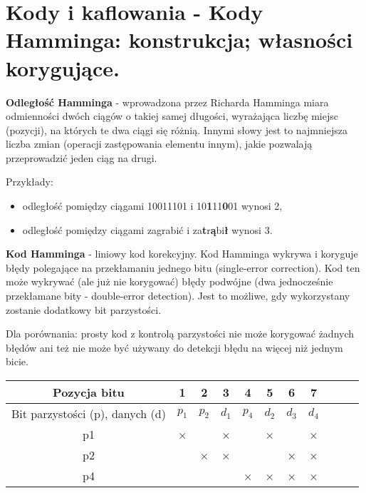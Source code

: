 \section{Kody i kaflowania - Kody Hamminga: konstrukcja; własności korygujące.}

\textbf{Odległość Hamminga} - wprowadzona przez Richarda Hamminga miara odmienności dwóch ciągów o takiej samej długości,
wyrażająca liczbę miejsc (pozycji), na których te dwa ciągi się różnią.
Innymi słowy jest to najmniejsza liczba zmian (operacji zastępowania elementu innym),
jakie pozwalają przeprowadzić jeden ciąg na drugi.

Przykłady:
\begin{itemize}
    \item odległość pomiędzy ciągami 10011101 i 10\textbf{1}11\textbf{0}01 wynosi 2,
    \item odległość pomiędzy ciągami zagrabić i za\textbf{t}r\textbf{ą}bi\textbf{ł} wynosi 3.
\end{itemize}

\textbf{Kod Hamminga} - liniowy kod korekcyjny.
Kod Hamminga wykrywa i koryguje błędy polegające na przekłamaniu jednego bitu (single-error correction).
Kod ten może wykrywać (ale już nie korygować) błędy podwójne (dwa jednocześnie przekłamane bity - double-error detection).
Jest to możliwe, gdy wykorzystany zostanie dodatkowy bit parzystości.

Dla porównania: prosty kod z kontrolą parzystości nie może korygować żadnych błędów
ani też nie może być używany do detekcji błędu na więcej niż jednym bicie.

\begin{tabular}{ |c|c|c|c|c|c|c|c|c|c|c| }
    \hline
    Pozycja bitu                    & 1     & 2     & 3     & 4     & 5     & 6     & 7     \\
    \hline

    Bit parzystości (p), danych (d) & $p_1$ & $p_2$ & $d_1$ & $p_4$ & $d_2$ & $d_3$ & $d_4$ \\
    \hline

    p1                              & ×     &       & ×     &       & ×     &       & ×     \\
    p2                              &       & ×     & ×     &       &       & ×     & ×     \\
    p4                              &       &       &       & ×     & ×     & ×     & ×     \\
    \hline
\end{tabular}\\

